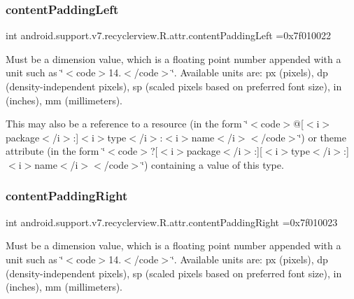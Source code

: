 \subsubsection{\texorpdfstring{content\+Padding\+Left}{contentPaddingLeft}}
{\footnotesize\ttfamily int android.\+support.\+v7.\+recyclerview.\+R.\+attr.\+content\+Padding\+Left =0x7f010022\hspace{0.3cm}{\ttfamily [static]}}

Must be a dimension value, which is a floating point number appended with a unit such as \char`\"{}$<$code$>$14.\+5sp$<$/code$>$\char`\"{}. Available units are\+: px (pixels), dp (density-\/independent pixels), sp (scaled pixels based on preferred font size), in (inches), mm (millimeters). 

This may also be a reference to a resource (in the form \char`\"{}$<$code$>$@\mbox{[}$<$i$>$package$<$/i$>$\+:\mbox{]}$<$i$>$type$<$/i$>$\+:$<$i$>$name$<$/i$>$$<$/code$>$\char`\"{}) or theme attribute (in the form \char`\"{}$<$code$>$?\mbox{[}$<$i$>$package$<$/i$>$\+:\mbox{]}\mbox{[}$<$i$>$type$<$/i$>$\+:\mbox{]}$<$i$>$name$<$/i$>$$<$/code$>$\char`\"{}) containing a value of this type. \mbox{\label{classandroid_1_1support_1_1v7_1_1recyclerview_1_1R_1_1attr_ad558e2ba42003985945d4cdf8f9d1ea4}} 
\subsubsection{\texorpdfstring{content\+Padding\+Right}{contentPaddingRight}}
{\footnotesize\ttfamily int android.\+support.\+v7.\+recyclerview.\+R.\+attr.\+content\+Padding\+Right =0x7f010023\hspace{0.3cm}{\ttfamily [static]}}

Must be a dimension value, which is a floating point number appended with a unit such as \char`\"{}$<$code$>$14.\+5sp$<$/code$>$\char`\"{}. Available units are\+: px (pixels), dp (density-\/independent pixels), sp (scaled pixels based on preferred font size), in (inches), mm (millimeters). 

